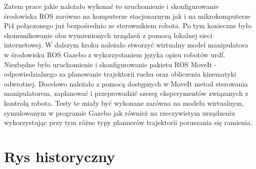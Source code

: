 Zatem prace jakie należało wykonać to uruchomienie i skonfigurowanie środowiska ROS zarówno na komputerze stacjonarnym jak i na mikrokomputerze Pi4 połączonego już bezpośrednio ze sterownikiem robota. Po tym konieczne było skomunikowanie obu wymienionych urządzeń z pomocą lokalnej sieci internetowej. W dalszym kroku należało stworzyć wirtualny model manipulatora w środowisku ROS Gazebo z wykorzystaniem języka opisu robotów urdf. Niezbędne było uruchomienie i skonfigurowanie pakietu ROS MoveIt -
odpowiedzialnego za planowanie trajektorii ruchu oraz obliczenia
kinematyki odwrotnej. Docelowo należało z pomocą dostępnych w MoveIt metod sterowania manipulatorem, zaplanować i przeprowadzić szereg eksperymentów związanych z kontrolą robota. Testy te miały być wykonane zarówno na modelu wirtualnym, symulowanym w programie Gazebo jak również na rzeczywistym urządzeniu wykorzystując przy tym różne typy plannerów trajektorii poruszania się ramienia.  

%
%


\section{Rys historyczny}